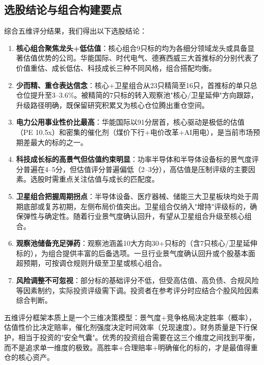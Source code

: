 \subsection{选股结论与组合构建要点}

综合五维评分结果，我们得出以下选股结论：

\vspace{0.2em}
\begin{enumerate}[leftmargin=2em]
\item \textbf{核心组合聚焦龙头+低估值}：核心组合9只标的均为各细分领域龙头或具备显著估值优势的公司。华能国际、时代电气、德赛西威三大首推标的分别代表了价值重估、成长低估、科技成长三种不同风格，组合搭配均衡。
\item \textbf{少而精、重仓表达信念}：核心+卫星组合从23只精简至16只，首推标的单只总仓位提升至3--3.6\%。被精简的7只标的转入观察池"核心/卫星延伸"方向跟踪，升级路径明确，既保留研究积累又为核心仓位腾出重仓空间。
\item \textbf{电力公用事业性价比最高}：华能国际以91分居首，核心驱动是极低的估值（PE 10.5x）和密集的催化剂（煤价下行+电价改革+AI用电），是当前市场预期差最大的标的之一。
\item \textbf{科技成长标的高景气但估值约束明显}：功率半导体和半导体设备标的景气度评分普遍在4--5分，但估值评分普遍偏低（2--3分），高估值是压制评级的主要因素。选股时需重点关注估值与成长的匹配度。
\item \textbf{卫星组合把握周期拐点}：半导体设备、医疗器械、储能三大卫星板块均处于周期底部或复苏初期，左侧布局价值突出。卫星组合仅纳入"增持"评级标的，确保弹性与确定性。随着行业景气度确认回升，有望从卫星组合升级至核心组合。
\item \textbf{观察池储备充足弹药}：观察池涵盖10大方向30+只标的（含7只核心/卫星延伸标的），为组合提供丰富的后备选项。一旦行业景气度确认回升或个股基本面超预期，可按调仓规则升级至卫星或核心组合。
\item \textbf{风险调整不可忽视}：部分标的基础评分不低，但受高估值、高负债、合规风险等因素制约，实际投资评级需下调。投资者在参考评分时应结合个股风险因素综合判断。
\end{enumerate}

\begin{keyinsight}
五维评分框架本质上是一个三维决策模型：景气度+竞争格局决定胜率（概率），估值性价比决定赔率，催化剂强度决定时间效率（兑现速度）。财务质量是下行保护，相当于投资的"安全气囊"。优秀的投资组合需要在这三个维度之间找到平衡，而不是追求单一维度的极致。高胜率+合理赔率+明确催化的标的，才是最值得重仓的核心资产。
\end{keyinsight}
